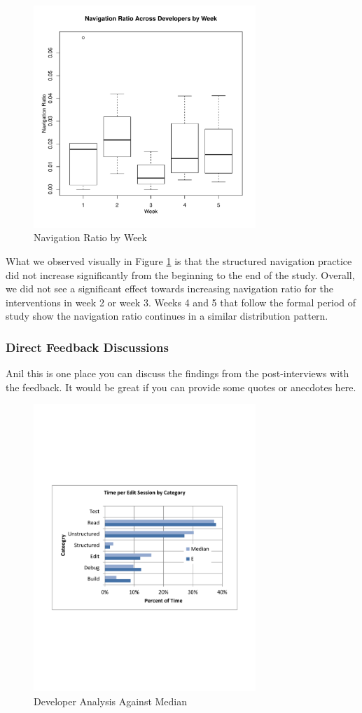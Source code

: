 \documentclass{sig-alternate}
\begin{document}
\begin{figure}
	\includegraphics[width=3.3in]{navratioboxplot.pdf}
	\caption{Navigation Ratio by Week}
	\label{fig:navigationaverage}
\end{figure}

What we observed visually in Figure \ref{fig:navigationaverage} is that the structured navigation practice did not increase significantly from the beginning to the end of the study.  Overall, we did not see a significant effect towards increasing navigation ratio for the interventions in week 2 or week 3.   Weeks 4 and 5 that follow the formal period of study show the navigation ratio continues in a similar distribution pattern.

\subsubsection{Direct Feedback Discussions}

Anil this is one place  you can discuss the findings from the post-interviews with the feedback.  It would be great if you can provide some quotes or anecdotes here.

\begin{figure}
	\includegraphics[width=3.3in]{developerEmedian.pdf}
	\caption{Developer Analysis Against Median}
	\label{fig:developercomparison}
\end{figure}
\end{document}
